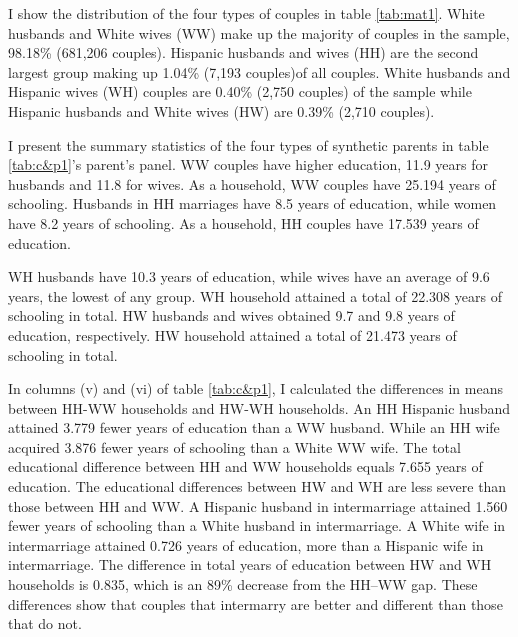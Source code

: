 \documentclass[12pt, fullpage]{article}
\begin{document}
I show the distribution of the four types of couples in table \ref{tab:mat1}. White husbands and White wives (WW) make up the majority of couples in the sample, 98.18\% (681,206 couples). Hispanic husbands and wives (HH) are the second largest group making up 1.04\% (7,193 couples)of all couples. White husbands and Hispanic wives (WH) couples are 0.40\% (2,750 couples) of the sample while Hispanic husbands and White wives (HW) are 0.39\% (2,710 couples). 


I present the summary statistics of the four types of synthetic parents in table \ref{tab:c&p1}'s parent's panel. WW couples have higher education, 11.9 years for husbands and 11.8 for wives. As a household, WW couples have 25.194 years of schooling. Husbands in HH marriages have 8.5 years of education, while women have 8.2 years of schooling. As a household, HH couples have 17.539 years of education.

WH husbands have 10.3 years of education, while wives have an average of 9.6 years, the lowest of any group. WH household attained a total of 22.308 years of schooling in total. HW husbands and wives obtained 9.7 and 9.8 years of education, respectively. HW household attained a total of 21.473 years of schooling in total.

\newpage





\newpage

In columns (v) and (vi) of table \ref{tab:c&p1}, I calculated the differences in means between HH-WW households and HW-WH households. An HH Hispanic husband attained 3.779 fewer years of education than a WW husband. While an HH wife acquired 3.876 fewer years of schooling than a White WW wife. The total educational difference between HH and WW households equals 7.655 years of education. The educational differences between HW and WH are less severe than those between HH and WW. A Hispanic husband in intermarriage attained 1.560 fewer years of schooling than a White husband in intermarriage. A White wife in intermarriage attained 0.726 years of education, more than a Hispanic wife in intermarriage. The difference in total years of education between HW and WH households is 0.835, which is an 89\% decrease from the HH--WW gap. These differences show that couples that intermarry are better and different than those that do not.

\end{document}
